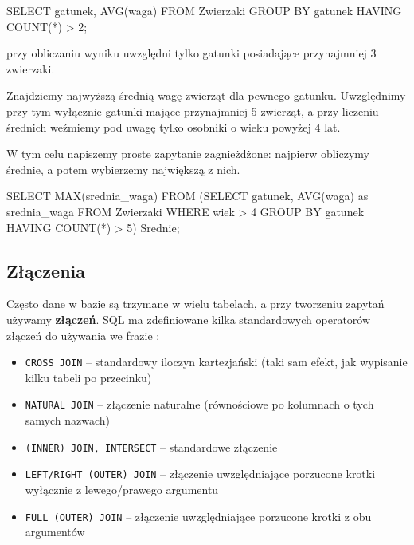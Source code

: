 \begin{sql}
	SELECT gatunek, AVG(waga)
	FROM Zwierzaki
	GROUP BY gatunek
	HAVING COUNT(*) > 2;
\end{sql}

przy obliczaniu wyniku uwzględni tylko gatunki posiadające przynajmniej 3 zwierzaki.

\begin{example}
	Znajdziemy najwyższą średnią wagę zwierząt dla pewnego gatunku. Uwzględnimy przy tym wyłącznie gatunki mające przynajmniej 5 zwierząt, a przy liczeniu średnich weźmiemy pod uwagę tylko osobniki o wieku powyżej 4 lat.
	
	 W tym celu napiszemy proste zapytanie zagnieżdżone: najpierw obliczymy średnie, a potem wybierzemy największą z nich.
	
    \begin{sql}
        SELECT MAX(srednia_waga)
        FROM (SELECT gatunek, AVG(waga) as srednia_waga
              FROM Zwierzaki
              WHERE wiek > 4
              GROUP BY gatunek
              HAVING COUNT(*) > 5) Srednie;
    \end{sql}
\end{example}

\subsection{Złączenia}

Często dane w bazie są trzymane w wielu tabelach, a przy tworzeniu zapytań używamy \textbf{złączeń}. SQL ma zdefiniowane kilka standardowych operatorów złączeń do używania we frazie :

\begin{itemize}
    \item \texttt{CROSS JOIN} -- standardowy iloczyn kartezjański (taki sam efekt, jak wypisanie kilku tabeli po przecinku)
    \item \texttt{NATURAL JOIN} -- złączenie naturalne (równościowe po kolumnach o tych samych nazwach)
    \item \texttt{(INNER) JOIN, INTERSECT} -- standardowe złączenie  
    \item \texttt{LEFT/RIGHT (OUTER) JOIN} -- złączenie uwzględniające porzucone krotki wyłącznie z lewego/prawego argumentu
    \item \texttt{FULL (OUTER) JOIN} -- złączenie uwzględniające porzucone krotki z obu argumentów
    
\end{itemize}

